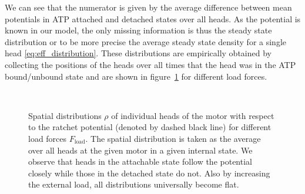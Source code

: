 \documentclass[aps,pre,twocolumn,showpacs,showkeys,superscriptaddress,floatfix]{revtex4-1}
\begin{document}
We can see that the numerator is given by the average difference between mean potentials in ATP attached and detached states over all heads. 
As the potential is known in our model, the only missing information is thus the steady state distribution 
or to be more precise the average steady state density for a single head \eqref{eq:eff_distribution}.  
These distributions are empirically obtained by collecting the positions of the heads over all times that the head was in the ATP bound/unbound state 
and are shown in figure~\ref{fig:pos_distr} for different load forces. 
\begin{figure}[t]
\centering
{}
\\
\caption{
\label{fig:pos_distr}
Spatial distributions $\rho$ of individual heads of the motor with respect to the ratchet potential (denoted by dashed black line) for different load forces $F_\text{load}$.
The spatial distribution is taken as the average over all heads at the given motor in a given internal state.
We observe that heads in the attachable state follow the potential closely while those in the detached state do not. 
Also by increasing the external load, all distributions universally become flat. 
}
\end{figure}
\end{document}
